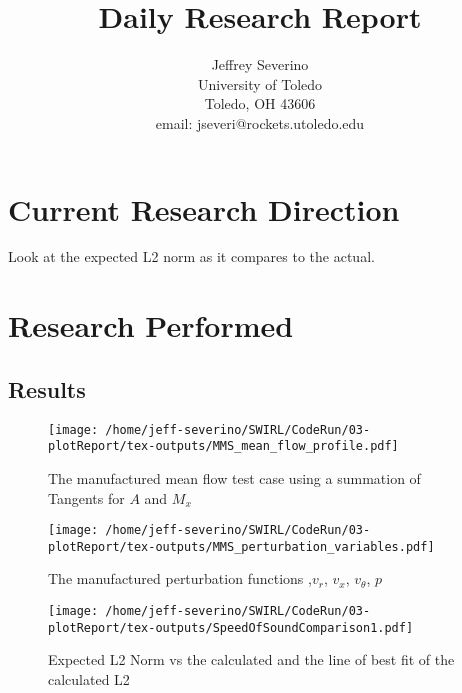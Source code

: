 \documentclass[a4paper]{article}
\begin{document}
\begin{titlepage}

    \title{
    Daily Research Report}

    \author{ Jeffrey Severino \\
        University of Toledo \\
        Toledo, OH  43606 \\
    email: jseveri@rockets.utoledo.edu}


    \maketitle

\end{titlepage}
\section{Current Research Direction}
Look at the expected L2 norm as it compares to the actual. 

\section{Research Performed}

\subsection{Results}
\begin{figure}[!]
    \centering
    \texttt{[image: /home/jeff-severino/SWIRL/CodeRun/03-plotReport/tex-outputs/MMS\_mean\_flow\_profile.pdf]}
    \caption{The manufactured mean flow test case using a summation of Tangents for $A$ and $M_x$}
    \label{fig:1}
\end{figure}

\begin{figure}[!]
    \centering
    \texttt{[image: /home/jeff-severino/SWIRL/CodeRun/03-plotReport/tex-outputs/MMS\_perturbation\_variables.pdf]}
    \caption{The manufactured perturbation functions ,$v_r$, $v_x$, $v_{\theta}$, $p$}
    \label{fig:1a}
\end{figure}

\begin{figure}[!]
    \centering
    \texttt{[image: /home/jeff-severino/SWIRL/CodeRun/03-plotReport/tex-outputs/SpeedOfSoundComparison1.pdf]}
    \caption{Expected L2 Norm vs the calculated and the line of best fit of 
    the calculated L2}
    \label{fig:2}
\end{figure}
\end{document}
